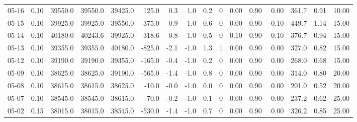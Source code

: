 \begin{threeparttable}
{\begin{tabular}{lrrrrrrrrrrrrrrr}
  05-16 &     0.10 & 39550.0 & 39550.0 & 39425.0 &      125.0 &            0.3 &                      1.0 &                 0.2 &              0 &       0.00 &      0.90 &           0.00 &            361.7 &            0.91 &                  10.00 \\
  05-15 &     0.10 & 39925.0 & 39925.0 & 39550.0 &      375.0 &            0.9 &                      1.0 &                 0.6 &              0 &       0.00 &      0.90 &          -0.10 &            449.7 &            1.14 &                  15.00 \\
  05-14 &     0.10 & 40180.0 & 40243.6 & 39925.0 &      318.6 &            0.8 &                      1.0 &                 0.5 &              0 &       0.10 &      0.90 &           0.10 &            376.7 &            0.94 &                  15.00 \\
  05-13 &     0.10 & 39355.0 & 39355.0 & 40180.0 &     -825.0 &           -2.1 &                     -1.0 &                 1.3 &              1 &       0.00 &      0.90 &           0.00 &            327.0 &            0.82 &                  15.00 \\
  05-12 &     0.10 & 39190.0 & 39190.0 & 39355.0 &     -165.0 &           -0.4 &                     -1.0 &                 0.2 &              0 &       0.00 &      0.90 &           0.00 &            268.0 &            0.68 &                  15.00 \\
  05-09 &     0.10 & 38625.0 & 38625.0 & 39190.0 &     -565.0 &           -1.4 &                     -1.0 &                 0.8 &              0 &       0.00 &      0.90 &           0.00 &            314.0 &            0.80 &                  20.00 \\
  05-08 &     0.10 & 38615.0 & 38615.0 & 38625.0 &      -10.0 &           -0.0 &                     -1.0 &                 0.0 &              0 &       0.00 &      0.90 &           0.00 &            201.0 &            0.52 &                  20.00 \\
  05-07 &     0.10 & 38545.0 & 38545.0 & 38615.0 &      -70.0 &           -0.2 &                     -1.0 &                 0.1 &              0 &       0.00 &      0.90 &           0.00 &            237.2 &            0.62 &                  25.00 \\
  05-02 &     0.15 & 38015.0 & 38015.0 & 38545.0 &     -530.0 &           -1.4 &                     -1.0 &                 0.7 &              0 &       0.00 &      0.90 &           0.00 &            326.2 &            0.85 &                  25.00 \\

\end{tabular}}
\end{threeparttable}
